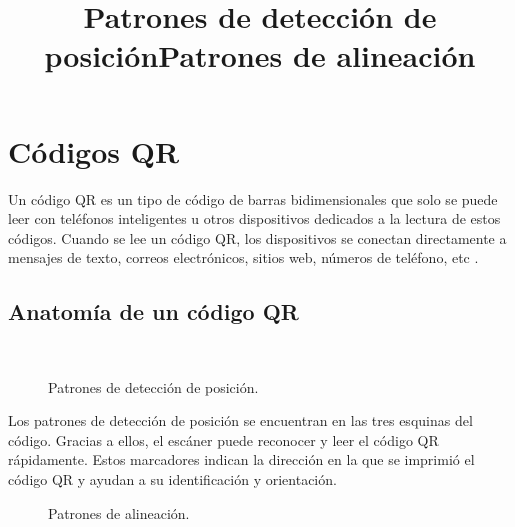 
\section{Códigos QR}
Un código QR es un tipo de código de barras bidimensionales que solo se puede leer con teléfonos inteligentes u otros dispositivos dedicados a la lectura de estos códigos. Cuando se lee un código QR, los dispositivos se conectan directamente a mensajes de texto, correos electrónicos, sitios web, números de teléfono, etc \cite{CitaA01}.

\subsection{Anatomía de un código QR}
\title{Patrones de detección de posición}\\

\begin{figure}[htbp]
	\begin{center}
		\caption{Patrones de detección de posición.}
		\label{fig:Patrones de deteccion de posicion2}
	\end{center}
\end{figure}

Los patrones de detección de posición se encuentran en las tres esquinas del código. Gracias a ellos, el escáner puede reconocer y leer el código QR rápidamente. Estos marcadores indican la dirección en la que se imprimió el código QR y ayudan a su identificación y orientación. \\

\title{Patrones de alineación}

\begin{figure}[htbp]
	\begin{center}
		\caption{Patrones de alineación.}
		\label{fig:Patrones de alineacion1}
	\end{center}
\end{figure}

